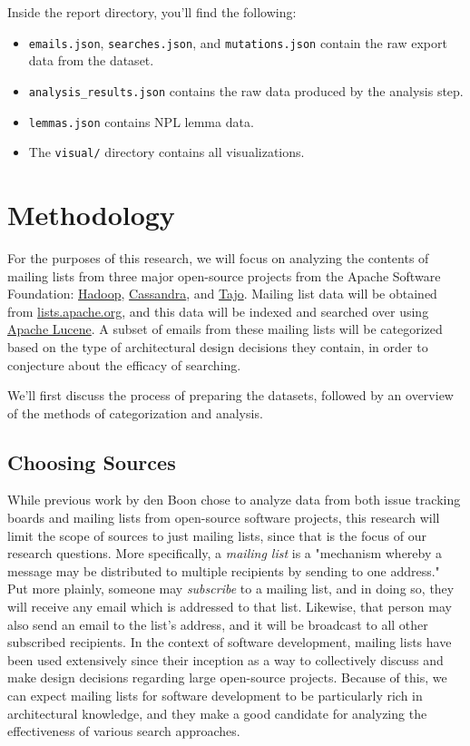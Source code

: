 \documentclass[a4paper, 12pt]{article}
\begin{document}
\begin{enumerate}
				Inside the report directory, you'll find the following:
				\begin{itemize}
					\item \texttt{emails.json}, \texttt{searches.json}, and \texttt{mutations.json} contain the raw export data from the dataset.
					\item \texttt{analysis\_results.json} contains the raw data produced by the analysis step.
					\item \texttt{lemmas.json} contains NPL lemma data.
					\item The \texttt{visual/} directory contains all visualizations.
				\end{itemize}
				
		\end{enumerate}

\section{Methodology}
	\label{sec:methodology}
	For the purposes of this research, we will focus on analyzing the contents of mailing lists from three major open-source projects from the Apache Software Foundation: \href{https://hadoop.apache.org/}{Hadoop}, \href{https://cassandra.apache.org}{Cassandra}, and \href{https://attic.apache.org/projects/tajo.html}{Tajo}. Mailing list data will be obtained from \href{https://lists.apache.org/}{lists.apache.org}, and this data will be indexed and searched over using \href{https://lucene.apache.org/}{Apache Lucene}. A subset of emails from these mailing lists will be categorized based on the type of architectural design decisions they contain, in order to conjecture about the efficacy of searching.
	
	We'll first discuss the process of preparing the datasets, followed by an overview of the methods of categorization and analysis.
	
	\subsection{Choosing Sources}
		While previous work by den Boon chose to analyze data from both issue tracking boards and mailing lists from open-source software projects\cite{denboon}, this research will limit the scope of sources to just mailing lists, since that is the focus of our research questions. More specifically, a \textit{mailing list} is a "mechanism whereby a message may be distributed to multiple recipients by sending to one address."\cite{mailinglistrfc} Put more plainly, someone may \textit{subscribe} to a mailing list, and in doing so, they will receive any email which is addressed to that list. Likewise, that person may also send an email to the list's address, and it will be broadcast to all other subscribed recipients. In the context of software development, mailing lists have been used extensively since their inception as a way to collectively discuss and make design decisions regarding large open-source projects. Because of this, we can expect mailing lists for software development to be particularly rich in architectural knowledge, and they make a good candidate for analyzing the effectiveness of various search approaches.
		
\end{document}
